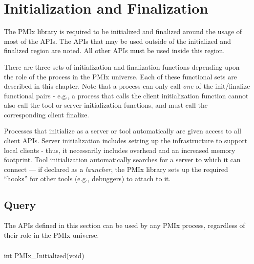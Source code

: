 \chapter{Initialization and Finalization}
\label{chap:api_init}

The \ac{PMIx} library is required to be initialized and finalized around the usage of most of the \acp{API}.
The \acp{API} that may be used outside of the initialized and finalized region are noted.
All other \acp{API} must be used inside this region.

There are three sets of initialization and finalization functions depending upon the role of the process in the \ac{PMIx} universe.
Each of these functional sets are described in this chapter.
Note that a process can only call \textit{one} of the init/finalize functional pairs - e.g., a process that calls the client initialization function cannot also call the tool or server initialization functions, and must call the corresponding client finalize.

\adviceuserstart
Processes that initialize as a server or tool automatically are given access to all client \acp{API}.
Server initialization includes setting up the infrastructure to support local clients - thus, it necessarily includes overhead and an increased memory footprint.
Tool initialization automatically searches for a server to which it can connect --- if declared as a \textit{launcher}, the \ac{PMIx} library sets up the required ``hooks'' for other tools (e.g., debuggers) to attach to it.
\adviceuserend


\section{Query}
\label{chap:api_init:general}

The APIs defined in this section can be used by any PMIx process, regardless of their role in the PMIx universe.

\subsection{}

\format

\cspecificstart
\begin{codepar}
int PMIx_Initialized(void)
\end{codepar}
\cspecificend

